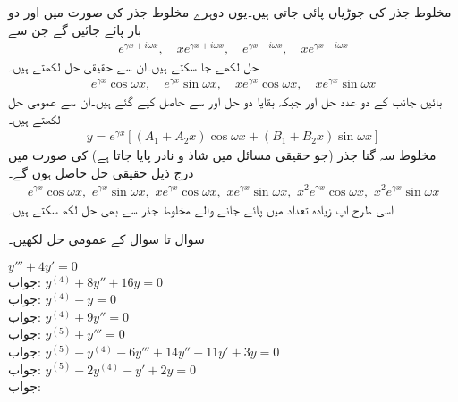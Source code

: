 مخلوط جذر کی جوڑیاں پائی جاتی ہیں۔یوں دوہرے مخلوط جذر کی صورت میں   اور  دو بار پائے جائیں گے جن سے 
\begin{align*}
e^{\gamma x+i\omega x}, \quad xe^{\gamma x+i\omega x}, \quad e^{\gamma x-i\omega x}, \quad xe^{\gamma x-i\omega x}
\end{align*}
حل لکھے جا سکتے ہیں۔ان سے حقیقی حل لکھتے ہیں۔
\begin{align}
e^{\gamma x}\cos \omega x,\quad  e^{\gamma x}\sin \omega x,\quad   xe^{\gamma x}\cos \omega x,\quad xe^{\gamma x}\sin \omega x 
\end{align}
بائیں جانب کے دو عدد حل  اور  جبکہ بقایا دو
 حل  اور   سے حاصل کیے گئے ہیں۔ان سے عمومی حل لکھتے ہیں۔
\begin{align}
y=e^{\gamma x}[(A_1+A_2 x)\cos \omega x+(B_1+B_2 x)\sin \omega x]
\end{align}
مخلوط سہ گنا جذر (جو حقیقی مسائل میں شاذ و نادر  پایا جاتا ہے) کی صورت میں درج ذیل حقیقی حل حاصل ہوں گے۔
\begin{align*}
e^{\gamma x}\cos \omega x,\,\,  e^{\gamma x}\sin \omega x,\,\,   xe^{\gamma x}\cos \omega x,\,\, xe^{\gamma x}\sin \omega x,\,\,   x^2e^{\gamma x}\cos \omega x,\,\, x^2e^{\gamma x}\sin \omega x 
\end{align*}
اسی طرح آپ زیادہ تعداد میں پائے جانے والے مخلوط جذر سے بھی حل لکھ سکتے ہیں۔



سوال  تا سوال  کے  عمومی حل لکھیں۔

\quad
$y'''+4y'=0$\\
جواب:
\quad
$y^{(4)}+8y''+16y=0$\\
جواب:
\quad
$y^{(4)}-y=0$\\
جواب:
\quad
$y^{(4)}+9y''=0$\\
جواب:
\quad
$y^{(5)}+y'''=0$\\
جواب:
\quad 
$y^{(5)}-y^{(4)}-6y'''+14y''-11y'+3y=0$\\
جواب:
\quad
$y^{(5)}-2y^{(4)}-y'+2y=0$\\
جواب:

